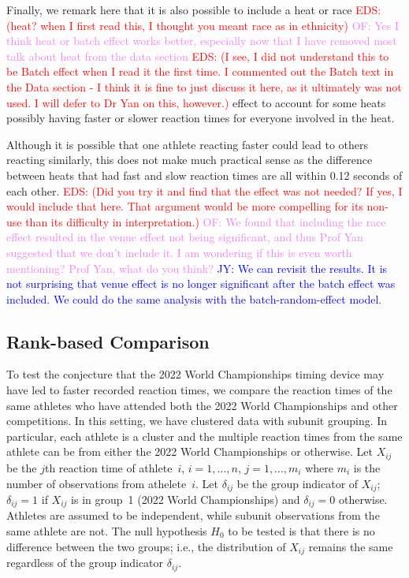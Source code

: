 \documentclass[12pt, letterpaper, titlepage]{article}
\newcommand{\jy}[1]{\textcolor{blue}{JY: #1}}
\newcommand{\eds}[1]{\textcolor{red}{EDS: (#1)}}
\newcommand{\of}[1]{\textcolor{violet}{OF: #1}}
\begin{document}
Finally, we remark here that it is also possible to include a heat or race 
\eds{heat? when I first read this, I thought you meant race as in ethnicity}
\of{Yes I think heat or batch effect works better, especially now that I have
removed most talk about heat from the data section} 
\eds{I see, I did not understand this to be Batch effect when I read it the 
first time.  I commented out the Batch text in the Data section - I think it is 
fine to just discuss it here, as it ultimately was not used.  I will defer to 
Dr Yan on this, however.}
effect to account for some heats possibly having faster or slower 
reaction times for everyone involved in the heat.

Although it is possible that one athlete reacting faster could lead to others reacting
similarly, this does not make much practical sense as the difference between
heats that had fast and slow reaction times are all within 0.12 seconds of each
other. 
\eds{Did you try it and find that the effect was not needed?  If yes,
I would include that here.  That argument 
would be more compelling for its non-use than its difficulty in interpretation.}
\of{We found that including the race effect resulted in the venue effect not
being significant, and thus Prof Yan suggested that we don't include it.  I am
wondering if this is even worth mentioning? Prof Yan, what do you think?} 
\jy{We can revisit the results. It is not surprising that venue effect is no
  longer significant after the batch effect was included. We could do the same
  analysis with the batch-random-effect model.}

\subsection{Rank-based Comparison}\label{sec:rank}


To test the conjecture that the 2022 World Championships timing device may have 
led to faster recorded reaction times, we compare the reaction times of the same
athletes who have attended both the 2022 World Championships and other 
competitions. 
In this setting, we have clustered data with subunit grouping. In particular,
each athlete is a cluster and the multiple reaction times from the same athlete
can be from either the 2022 World Championships or otherwise.
Let $X_{ij}$ be the $j$th reaction time of athlete~$i$, $i = 1, \ldots, n$,
$j = 1, \ldots, m_i$ where $m_i$ is the number of observations from
athelete~$i$. Let $\delta_{ij}$ be the group indicator of $X_{ij}$; $\delta_{ij}
= 1$ if $X_{ij}$ is in group~1 (2022 World Championships) and $\delta_{ij} = 0$ 
otherwise. Athletes are
assumed to be independent, while subunit observations from the same athlete are
not. The null hypothesis $H_0$ to be tested is that there is no difference
between the two groups; i.e., the distribution of $X_{ij}$ remains the same
regardless of the group indicator $\delta_{ij}$.
\end{document}
